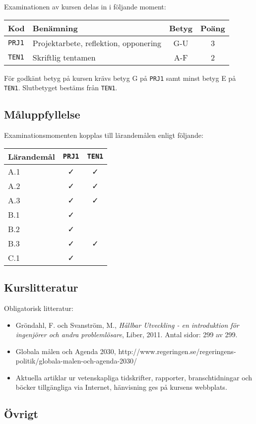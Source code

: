 Examinationen av kursen delas in i följande moment:

\begin{longtable}[]{@{}llcc@{}}
\toprule
\textsf{Kod} & \textsf{Benämning} & \textsf{Betyg} & \textsf{Poäng}\tabularnewline
\midrule
\endhead
\texttt{PRJ1} & Projektarbete, reflektion, opponering & G-U & 3\tabularnewline
\texttt{TEN1} & Skriftlig tentamen & A-F & 2\tabularnewline
\bottomrule
\end{longtable}

För godkänt betyg på kursen krävs betyg G på \texttt{PRJ1} samt minst betyg E på
\texttt{TEN1}. Slutbetyget bestäms från \texttt{TEN1}.

\subsection*{Måluppfyllelse}

Examinationsmomenten kopplas till lärandemålen enligt följande:

\begin{longtable}[]{@{}lcc@{}}
\toprule
\textsf{Lärandemål} & \texttt{PRJ1} & \texttt{TEN1}\tabularnewline
\midrule
\endhead
A.1 & \faCheck & \faCheck\tabularnewline
A.2 & \faCheck & \faCheck\tabularnewline
A.3 & \faCheck & \faCheck\tabularnewline
B.1 & \faCheck &\tabularnewline
B.2 & \faCheck &\tabularnewline
B.3 & \faCheck & \faCheck\tabularnewline
C.1 & \faCheck &\tabularnewline
\bottomrule
\end{longtable}

\subsection*{Kurslitteratur}

Obligatorisk litteratur:

\begin{itemize}
\tightlist
\item
  Gröndahl, F. och Svanström, M., \emph{Hållbar Utveckling - en
  introduktion för ingenjörer och andra problemlösare}, Liber, 2011.
  Antal sidor: 299 av 299.
\item
  Globala målen och Agenda 2030,
  http://www.regeringen.se/regeringens-politik/globala-malen-och-agenda-2030/
\item
  Aktuella artiklar ur vetenskapliga tidskrifter, rapporter,
  branschtidningar och böcker tillgängliga via Internet, hänvisning ges
  på kursens webbplats.
\end{itemize}

\subsection*{Övrigt}

